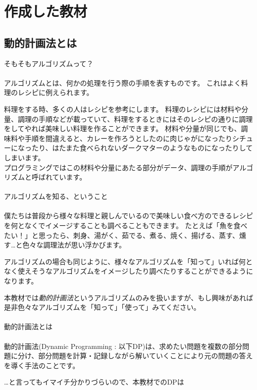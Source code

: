 \section{作成した教材}

\subsection{動的計画法とは}
\noindent
{\LARGE そもそもアルゴリズムって？}\\ \hrulefill \\
アルゴリズムとは、何かの処理を行う際の手順を表すものです。
これはよく料理のレシピに例えられます。

\noindent
料理をする時、多くの人はレシピを参考にします。
料理のレシピには材料や分量、調理の手順などが載っていて、料理をするときにはそのレシピの通りに調理をしてやれば美味しい料理を作ることができます。
材料や分量が同じでも、調味料や手順を間違えると、カレーを作ろうとしたのに肉じゃがになったりシチューになったり、はたまた食べられないダークマターのようなものになったりしてしまいます。\\
\noindent
プログラミングではこの材料や分量にあたる部分がデータ、調理の手順がアルゴリズムと呼ばれています。 
\\ \\
\noindent
{\LARGE アルゴリズムを知る、ということ}\\ \hrulefill \\
僕たちは普段から様々な料理と親しんでいるので美味しい食べ方のできるレシピを何となくでイメージすることも調べることもできます。
たとえば「魚を食べたい！」と思ったら、刺身、湯がく、茹でる、煮る、焼く、揚げる、蒸す、燻す…と色々な調理法が思い浮かびます。

\noindent
アルゴリズムの場合も同じように、様々なアルゴリズムを「知って」いれば何となく使えそうなアルゴリズムをイメージしたり調べたりすることができるようになります。

\noindent
本教材では\emph{動的計画法}というアルゴリズムのみを扱いますが、もし興味があれば是非色々なアルゴリズムを「知って」「使って」みてください。 
\\ \\
\noindent
{\LARGE 動的計画法とは}\\ \hrulefill \\
動的計画法(Dynamic Programming : 以下DP)は、求めたい問題を複数の部分問題に分け、部分問題を計算・記録しながら解いていくことにより元の問題の答えを導く手法のことです。

\noindent
…と言ってもイマイチ分かりづらいので、本教材でのDPは

